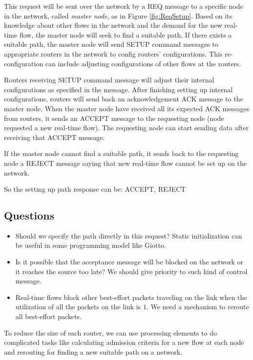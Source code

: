 \documentclass[10pt]{article}
\begin{document}
This request will be sent over the network by a REQ message to a specific node
in the network, called {\em master node}, as in Figure \ref{fig:ReqSetup}.
Based on its knowledge about other flows in the network and the demand for the
new real-time flow, the master node will seek to find a suitable path. If there
exists a suitable path, the master node will send SETUP command messages to
appropriate routers in the network to config routers' configurations. This re-configuration
can include adjusting configurations of other flows at the routers.

Routers receiving SETUP command message will adjust their internal
configurations as specified in the message. After finishing setting up internal
configurations, routers will send back an acknowledgement ACK message to
the master node. When the master node have received all its expected ACK
messages from routers, it sends an ACCEPT message to the requesting node
(node requested a new real-time flow). The requesting node can start sending
data after receiving that ACCEPT message.

If the master node cannot find a suitable path, it sends back to the requesting
node a REJECT message saying that new real-time flow cannot be set up on the
network.

So the setting up path response can be: ACCEPT, REJECT

\subsection{Questions}
\begin{itemize}
\item Should we specify the path directly in this request? Static initialization 
can be useful in some programming model like Giotto.	
\item Is it possible that the acceptance message will be blocked on the network 
or it reaches the source too late? We should give priority to such kind of control
message.
\item Real-time flows block other best-effort packets traveling on the link when 
the utilization of all the packets on the link is $1$. We need a mechanism to
reroute all best-effort packets.
\end{itemize}

To reduce the size of each router, we can use processing elements to do 
complicated tasks like calculating admission criteria for a new flow at each node 
and rerouting for finding a new suitable path on a network.
\end{document}
